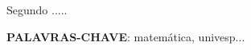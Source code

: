 
\setlength{\absparsep}{18pt} %
\begin{resumo}
	Segundo .....
	
	\textbf{PALAVRAS-CHAVE}: matemática, univesp...
\end{resumo}


\listoffigures*
\clearpage


\tableofcontents*
\clearpage

